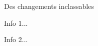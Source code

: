 \begin{bdoctopic}{Des changements inclassables}
    \item Info 1...
    \item Info 2...
\end{bdoctopic}

